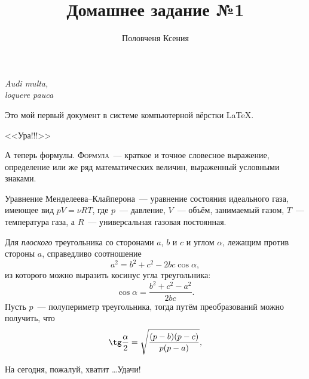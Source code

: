 \documentclass[12pt]{article}
\title{Домашнее задание №1}
\author{Половченя Ксения}
\date{}
\begin{document}
	\maketitle
	\begin{flushright}
		{\itshape Audi multa,\\ loquere pauca}
	\end{flushright}
	\vspace{20pt}
	Это мой первый документ в системе компьютерной вёрстки \LaTeX.
	
	\begin{center}
		{\LARGE \sffamily <<Ура!!!>>}
	\end{center}
	\vspace{15pt}
	
	А теперь формулы. {\scshape Формула}~--- краткое и точное словесное выражение, определение или же ряд математических величин, выраженный условными знаками.
	\vspace{15pt}
	
	\hspace{28pt}{\Large \bfseries Термодинамика}
	
	Уравнение Менделеева--Клайперона~--- уравнение состояния идеального газа, имеющее вид $p V = \nu R T$, где $p$~--- давление,  $V$~--- объём, занимаемый газом, $T$~--- температура газа, а $R$~--- универсальная газовая постоянная.
	\vspace{15pt}
	
	\hspace{28pt}{\Large \bfseries Геометрия \hfill Планиметрия}
	
	Для {\slshape плоского} треугольника со сторонами $a$, $b$ и $c$ и углом $\alpha$, лежащим против стороны $a$, справедливо соотношение 
	$$a^2 = b^2 + c^2 - 2 b c \cos\alpha,$$ из которого можно выразить косинус угла треугольника: $$\cos\alpha = \frac{b^2 + c^2 - a^2}{2 b c}.$$
	Пусть $p$~--- полупериметр треугольника, тогда путём преобразований можно получить, что $$\tg\frac{\alpha}{2} = \sqrt{\frac{(p - b)(p - c)}{p (p - a)}},$$
	
	\vspace{1cm}
	\begin{flushleft}
		На сегодня, пожалуй, хватит \ldots Удачи!
	\end{flushleft}
	
\end{document}
